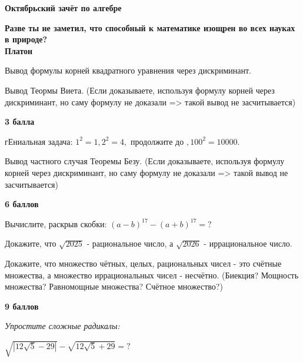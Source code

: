 \centerline{\bf \Huge Октябрьский зачёт по алгебре }

\begin{flushright}
        \scriptsize{\textbf{Разве ты не заметил, что способный к математике изощрен во всех науках в природе?\\
         Платон}}
        
\end{flushright}

 Вывод формулы корней квадратного уравнения через дискриминант.

 Вывод Теормы Виета. (Если доказываете, используя формулу корней через дискриминант, но саму формулу не доказали => такой вывод не засчитывается)

\begin{flushright} \textbf{3 балла}\\ 
\end{flushright}

 гЕниальная задача: $1^2=1, 2^2=4,$ продолжите до $,100^2=10000$.

 Вывод частного случая Теоремы Безу. (Если доказываете, используя формулу корней через дискриминант, но саму формулу не доказали => такой вывод не засчитывается)

\begin{flushright} \textbf{6 баллов}\\ 
\end{flushright}

 Вычислите, раскрыв скобки: $(a-b)^{17} - (a+b)^{17}=?$

 Докажите, что $\sqrt{2025}$ - рациональное число, а $\sqrt{2026}$ - иррациональное число.

 Докажите, что множество чётных, целых, рациональных чисел - это счётные множества, а множество иррациональных чисел - несчётно. (Биекция? Мощность множества? Равномощные множества? Счётное множество?)

\begin{flushright} \textbf{9 баллов}\\ 
\end{flushright}

\centerline{\textit{Упростите сложные радикалы:}}

  $\sqrt{|12\sqrt{5} -  29|} - \sqrt{12\sqrt{5} +  29}=?$


